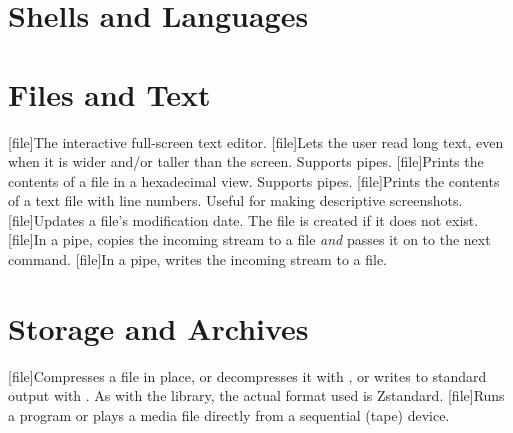 \section{Shells and Languages}

\begin{outline}
\1
\1
\1
\end{outline}

\section{Files and Text}

\begin{outline}
\1[file]{The interactive full-screen text editor.}
\1
\1[file]{Lets the user read long text, even when it is wider and/or taller than the screen. Supports pipes.}
\1[file]{Prints the contents of a file in a hexadecimal view. Supports pipes.}
\1[file]{Prints the contents of a text file with line numbers. Useful for making descriptive screenshots.}
\1[file]{Updates a file's modification date. The file is created if it does not exist.}
\1[file]{In a pipe, copies the incoming stream to a file \emph{and} passes it on to the next command.}
\1[file]{In a pipe, writes the incoming stream to a file.}
\end{outline}

\section{Storage and Archives}

\begin{outline}
\1
\1
\1[file]{Compresses a file in place, or decompresses it with , or writes to standard output with . As with the  library, the actual format used is Zstandard.}
\1
\1[file]{Runs a program or plays a media file directly from a sequential (tape) device.}
\end{outline}

